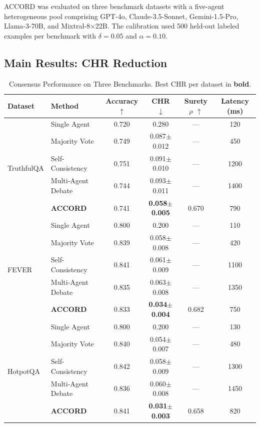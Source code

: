 \documentclass[12pt,a4paper]{report}
\begin{document}
ACCORD was evaluated on three benchmark datasets with a five-agent heterogeneous pool comprising GPT-4o, Claude-3.5-Sonnet, Gemini-1.5-Pro, Llama-3-70B, and Mixtral-8$\times$22B. The calibration used 500 held-out labeled examples per benchmark with $\delta = 0.05$ and $\alpha = 0.10$.

\subsection{Main Results: CHR Reduction}

\begin{table}[H]
\centering
\caption{Consensus Performance on Three Benchmarks. Best CHR per dataset in \textbf{bold}.}
\label{tab:main_results}
\begin{tabular}{llcccc}
\toprule
Dataset & Method & Accuracy $\uparrow$ & CHR $\downarrow$ & Surety $\rho$ $\uparrow$ & Latency (ms) \\
\midrule
\multirow{5}{*}{TruthfulQA}
 & Single Agent    & 0.720 & 0.280          & ---   & 120  \\
 & Majority Vote   & 0.749 & 0.087$\pm$0.012 & ---   & 450  \\
 & Self-Consistency & 0.751 & 0.091$\pm$0.010 & ---   & 1200 \\
 & Multi-Agent Debate & 0.744 & 0.093$\pm$0.011 & --- & 1400 \\
 & \textbf{ACCORD} & 0.741 & \textbf{0.058$\pm$0.005} & 0.670 & 790 \\
\midrule
\multirow{5}{*}{FEVER}
 & Single Agent    & 0.800 & 0.200          & ---   & 110  \\
 & Majority Vote   & 0.839 & 0.058$\pm$0.008 & ---   & 420  \\
 & Self-Consistency & 0.841 & 0.061$\pm$0.009 & ---   & 1100 \\
 & Multi-Agent Debate & 0.835 & 0.063$\pm$0.008 & --- & 1350 \\
 & \textbf{ACCORD} & 0.833 & \textbf{0.034$\pm$0.004} & 0.682 & 750 \\
\midrule
\multirow{5}{*}{HotpotQA}
 & Single Agent    & 0.800 & 0.200          & ---   & 130  \\
 & Majority Vote   & 0.840 & 0.054$\pm$0.007 & ---   & 480  \\
 & Self-Consistency & 0.842 & 0.058$\pm$0.009 & ---   & 1300 \\
 & Multi-Agent Debate & 0.836 & 0.060$\pm$0.008 & --- & 1450 \\
 & \textbf{ACCORD} & 0.841 & \textbf{0.031$\pm$0.003} & 0.658 & 820 \\
\bottomrule
\end{tabular}
\end{table}
\end{document}
